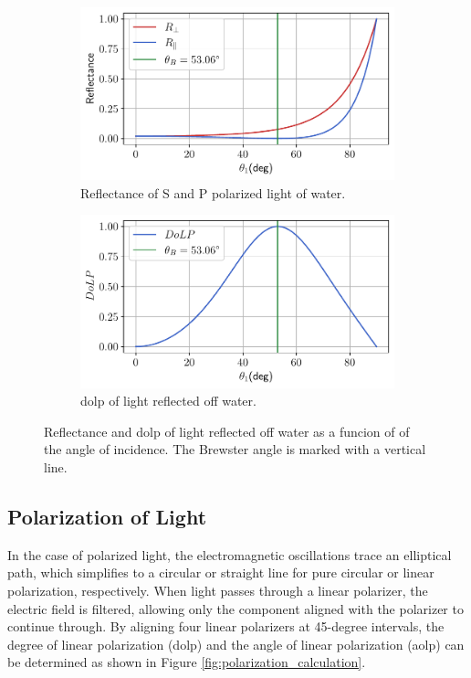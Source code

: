 \begin{figure}[H]
    \centering
    \begin{subfigure}{.5\textwidth}
        \centering
        \includegraphics[width=\textwidth]{figures/pol_plots/brewster0.pdf}
        \caption{Reflectance of S and P polarized light of water.}
        \label{fig:brewster0}
    \end{subfigure}%
    \begin{subfigure}{.5\textwidth}
        \centering
        \includegraphics[width=\textwidth]{figures/pol_plots/brewster1.pdf}
        \caption{\gls{dolp} of light reflected off water.}
        \label{fig:brewster1}
    \end{subfigure}
    \caption{Reflectance and \gls{dolp} of light reflected off water as a funcion of of the angle of incidence.
        The Brewster angle is marked with a vertical line.}
    \label{fig:test}
\end{figure}




\subsection{Polarization of Light}
In the case of polarized light, the electromagnetic oscillations trace an elliptical path, which simplifies to a circular or straight line for pure circular or linear polarization, respectively.
When light passes through a linear polarizer, the electric field is filtered, allowing only the component aligned with the polarizer to continue through.
By aligning four linear polarizers at 45-degree intervals, the degree of linear polarization (\gls{dolp}) and the angle of linear polarization (\gls{aolp}) can be determined as shown in Figure \ref{fig:polarization_calculation}.

